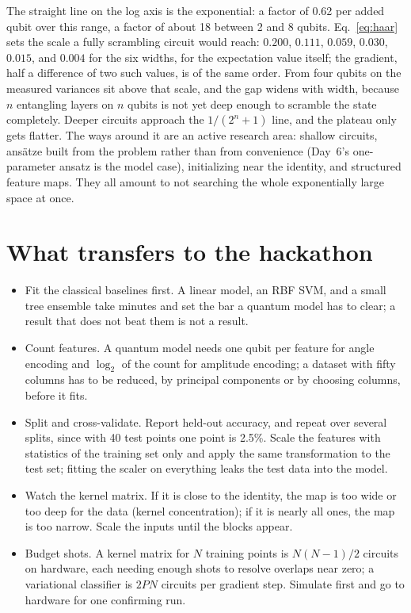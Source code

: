 \documentclass[11pt]{article}
\begin{document}
The straight line on the log axis is the exponential: a factor of 0.62 per added qubit over this range, a factor of about 18 between 2 and 8 qubits. Eq.~\eqref{eq:haar} sets the scale a fully scrambling circuit would reach: $0.200$, $0.111$, $0.059$, $0.030$, $0.015$, and $0.004$ for the six widths, for the expectation value itself; the gradient, half a difference of two such values, is of the same order. From four qubits on the measured variances sit above that scale, and the gap widens with width, because $n$ entangling layers on $n$ qubits is not yet deep enough to scramble the state completely. Deeper circuits approach the $1/(2^n+1)$ line, and the plateau only gets flatter. The ways around it are an active research area: shallow circuits, ansätze built from the problem rather than from convenience (Day~6's one-parameter ansatz is the model case), initializing near the identity, and structured feature maps. They all amount to not searching the whole exponentially large space at once.

\section{What transfers to the hackathon}

\begin{itemize}
\item Fit the classical baselines first. A linear model, an RBF SVM, and a small tree ensemble take minutes and set the bar a quantum model has to clear; a result that does not beat them is not a result.
\item Count features. A quantum model needs one qubit per feature for angle encoding and $\log_2$ of the count for amplitude encoding; a dataset with fifty columns has to be reduced, by principal components or by choosing columns, before it fits.
\item Split and cross-validate. Report held-out accuracy, and repeat over several splits, since with 40 test points one point is 2.5\%. Scale the features with statistics of the training set only and apply the same transformation to the test set; fitting the scaler on everything leaks the test data into the model.
\item Watch the kernel matrix. If it is close to the identity, the map is too wide or too deep for the data (kernel concentration); if it is nearly all ones, the map is too narrow. Scale the inputs until the blocks appear.
\item Budget shots. A kernel matrix for $N$ training points is $N(N-1)/2$ circuits on hardware, each needing enough shots to resolve overlaps near zero; a variational classifier is $2PN$ circuits per gradient step. Simulate first and go to hardware for one confirming run.
\end{itemize}
\end{document}
